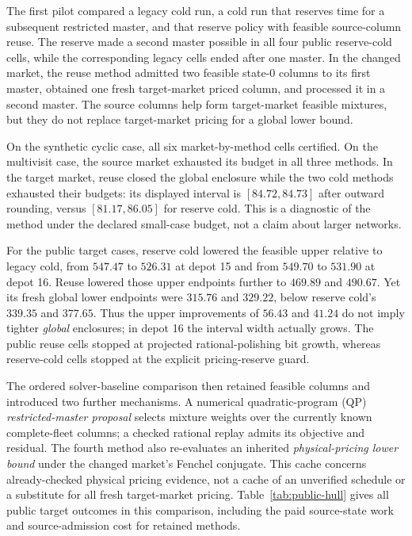 The first pilot compared a legacy cold run, a cold run that reserves time for a subsequent restricted master, and that reserve policy with feasible source-column reuse.  The reserve made a second master possible in all four public reserve-cold cells, while the corresponding legacy cells ended after one master.  In the changed market, the reuse method admitted two feasible state-0 columns to its first master, obtained one fresh target-market priced column, and processed it in a second master.  The source columns help form target-market feasible mixtures, but they do not replace target-market pricing for a global lower bound.

On the synthetic cyclic case, all six market-by-method cells certified.  On the multivisit case, the source market exhausted its budget in all three methods.  In the target market, reuse closed the global enclosure while the two cold methods exhausted their budgets: its displayed interval is $[84.72,84.73]$ after outward rounding, versus $[81.17,86.05]$ for reserve cold.  This is a diagnostic of the method under the declared small-case budget, not a claim about larger networks.

For the public target cases, reserve cold lowered the feasible upper relative to legacy cold, from $547.47$ to $526.31$ at depot 15 and from $549.70$ to $531.90$ at depot 16.  Reuse lowered those upper endpoints further to $469.89$ and $490.67$.  Yet its fresh global lower endpoints were $315.76$ and $329.22$, below reserve cold's $339.35$ and $377.65$.  Thus the upper improvements of $56.43$ and $41.24$ do not imply tighter \emph{global} enclosures; in depot 16 the interval width actually grows.  The public reuse cells stopped at projected rational-polishing bit growth, whereas reserve-cold cells stopped at the explicit pricing-reserve guard.

The ordered solver-baseline comparison then retained feasible columns and introduced two further mechanisms.  A numerical quadratic-program (QP) \emph{restricted-master proposal} selects mixture weights over the currently known complete-fleet columns; a checked rational replay admits its objective and residual.  The fourth method also re-evaluates an inherited \emph{physical-pricing lower bound} under the changed market's Fenchel conjugate.  This cache concerns already-checked physical pricing evidence, not a cache of an unverified schedule or a substitute for all fresh target-market pricing.  Table~\ref{tab:public-hull} gives all public target outcomes in this comparison, including the paid source-state work and source-admission cost for retained methods.


